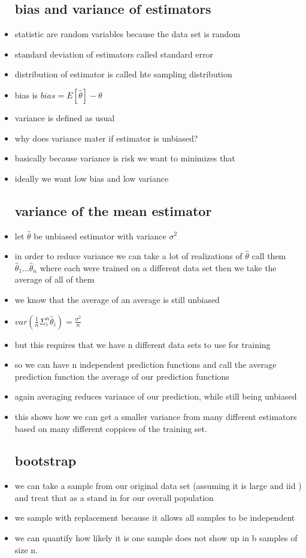 \documentclass{article}
\begin{document}
\begin{itemize}
\subsection*{bias and variance of estimators}
\item statistic are random variables because the data set is random 
\item standard deviation of estimators called standard error 
\item distribution of estimator is called hte sampling distribution
\item bias is $bias=E[\hat{\theta}]-\theta$
\item variance is defined as usual
\item why does variance mater if estimator is unbiased?
\item basically because variance is risk we want to minimizes that 
\item ideally we want low bias and low variance
\subsection*{variance of the mean estimator}
\item let $\hat{\theta}$ be unbiased estimator with variance $\sigma^2$
\item in order to reduce variance we can take a lot of realizations of $\hat{\theta}$ call them $\hat{\theta}_{1}...\hat{\theta}_n$ where each were trained on a different data set then we take the average of all of them 
\item we know that the average of an average is still unbiased
\item $var(\frac{1}{n}\Sigma_{i}^{n}\hat{\theta}_i)=\frac{\sigma^2}{n}$
\item but this requires that we have n different data sets to use for training 
\item so we can have n independent prediction functions and call the average prediction function the average of our prediction functions 
\item again averaging reduces variance of our prediction, while still being unbiased 
\item this shows how we can get a smaller variance from many different estimators based on many different coppices of the training set. 
\subsection*{bootstrap}
\item we can take a sample from our original data set (assuming it is large and iid ) and treat that as a stand in for our overall population 
\item we sample with replacement because it allows all samples to be independent
\item we can quantify how likely it is one sample does not show up in b samples of size n. 

\end{itemize}
\end{document}
